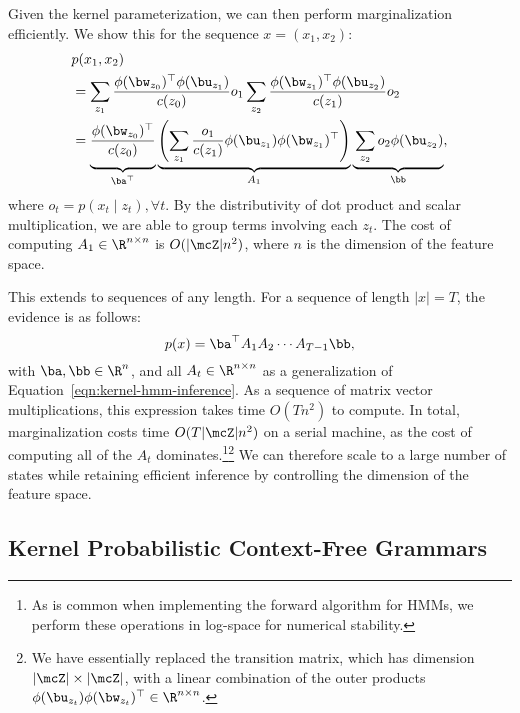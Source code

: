 Given the kernel parameterization, we can then perform marginalization efficiently. We show this for the sequence $x = (x_1,x_2)$:
\begin{equation}
\label{eqn:kernel-hmm-inference}
\begin{aligned}
&p(x_1,x_2)\\
&= \sum_{z_1} \frac{\phi(\bw_{z_0})^\top\phi(\bu_{z_1})}{c(z_0)}
o_1\sum_{z_2}\frac{\phi(\bw_{z_1})^\top\phi(\bu_{z_2})}{c(z_1)}o_2\\
&= \underbrace{
    \vphantom{\left(\sum_{z_1} 
        \frac{o_1}{c(z_1)}\phi(\bu_{z_1})\phi(\bw_{z_1})^\top
        \right)}
    \frac{\phi(\bw_{z_0})^\top}{c(z_0)}
}_{\ba^\top}
\underbrace{\left(\sum_{z_1} 
\frac{o_1}{c(z_1)}\phi(\bu_{z_1})\phi(\bw_{z_1})^\top
\right)}_{A_1}
\underbrace{
    \vphantom{\left(\sum_{z_1} 
        \frac{o_1}{c(z_1)}\phi(\bu_{z_1})\phi(\bw_{z_1})^\top
        \right)}
    \sum_{z_2}o_2\phi(\bu_{z_2})
}_{\bb},
\end{aligned}
\end{equation}
where $o_t = p(x_t \mid z_t), \forall t$.
By the distributivity of dot product and scalar multiplication, we are able to group terms involving each $z_t$.
The cost of computing $A_1\in\R^{n\times n}$ is $O(|\mcZ|n^2)$, where $n$ is the dimension of the feature space.

This extends to sequences of any length.
For a sequence of length $|x|=T$, the evidence is as follows:
\begin{equation}
    p(x) = \ba^\top A_1 A_2 \cdots A_{T-1}\bb,
\end{equation}
with $\ba,\bb\in\R^n$, and all $A_t\in\R^{n\times n}$
as a generalization of Equation~\ref{eqn:kernel-hmm-inference}.
As a sequence of matrix vector multiplications,
this expression takes time $O(Tn^2)$ to compute.
In total, marginalization costs time $O(T|\mcZ|n^2)$ on a serial machine,
as the cost of computing all of the $A_t$ dominates.\footnote{
As is common when implementing the forward algorithm for HMMs, we perform these operations in log-space for numerical stability.
}\footnote{
We have essentially replaced the transition matrix, which has dimension $|\mcZ|\times|\mcZ|$, with a linear combination of the outer products $\phi(\bu_{z_t})\phi(\bw_{z_t})^\top \in \R^{n \times n}$.
}
We can therefore scale to a large number of states while retaining efficient inference by controlling the dimension of the feature space.


\subsection*{Kernel Probabilistic Context-Free Grammars}

